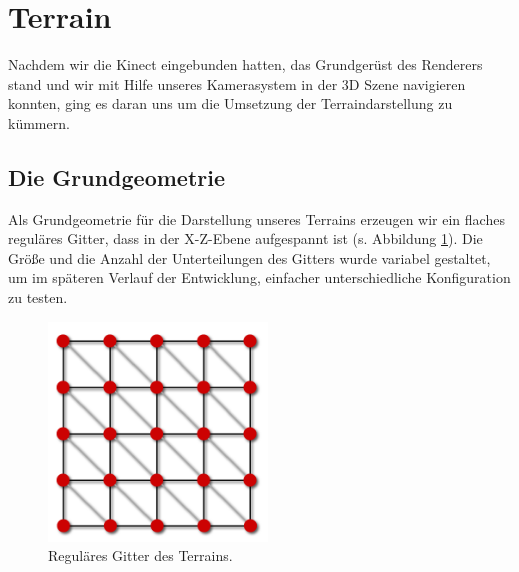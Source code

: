 \section{Terrain}
\begin{Spacing}{\mylinespace}

Nachdem wir die Kinect eingebunden hatten, das Grundgerüst des Renderers stand und wir mit Hilfe unseres Kamerasystem in der 3D Szene navigieren konnten, ging es daran uns um die Umsetzung der Terraindarstellung zu kümmern.

\subsection{Die Grundgeometrie}
Als Grundgeometrie für die Darstellung unseres Terrains erzeugen wir ein flaches reguläres Gitter, dass in der X-Z-Ebene aufgespannt ist (s. Abbildung \ref{fig:grid}). Die Größe und die Anzahl der Unterteilungen des Gitters wurde variabel gestaltet, um im späteren Verlauf der Entwicklung, einfacher unterschiedliche Konfiguration zu testen. 

\begin{figure}[h!]
	\centering
	\vspace*{10px}
	\includegraphics[width=220px]{graphics/grid.png}
	\caption{Reguläres Gitter des Terrains.}
	\label{fig:grid}
\end{figure}


\end{Spacing}
